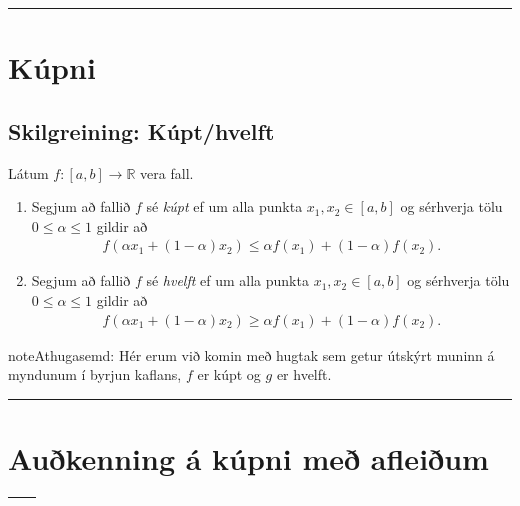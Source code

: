\documentclass[b5paper,11pt,icelandic]{sphinxmanual}
\begin{document}



\bigskip\hrule{}\bigskip



\section{Kúpni}
\label{kafli05:kupni}

\subsection{Skilgreining: Kúpt/hvelft}
\label{kafli05:index-0}\label{kafli05:skilgreining-kupt-hvelft}
Látum \(f:[a, b]\rightarrow {\mathbb  R}\) vera fall.
\begin{enumerate}
\item {} 
Segjum að fallið \(f\) sé \textit{kúpt} ef um
alla punkta \(x_1, x_2\in [a, b]\) og sérhverja tölu
\(0\leq
\alpha\leq 1\) gildir að
\begin{equation*}
\begin{split}f(\alpha x_1+(1-\alpha)x_2)\leq \alpha f(x_1)+(1-\alpha)f(x_2).\end{split}
\end{equation*}
\item {} 
Segjum að fallið \(f\) sé \textit{hvelft}
ef um alla punkta \(x_1, x_2\in [a, b]\) og sérhverja tölu
\(0\leq
\alpha\leq 1\) gildir að
\begin{equation*}
\begin{split}f(\alpha x_1+(1-\alpha)x_2)\geq \alpha f(x_1)+(1-\alpha)f(x_2).\end{split}
\end{equation*}
\end{enumerate}

\begin{notice}{note}{Athugasemd:}
Hér erum við komin með hugtak sem getur útskýrt muninn á myndunum í byrjun
kaflans, \(f\) er kúpt og \(g\) er hvelft.
\end{notice}


\bigskip\hrule{}\bigskip



\section{Auðkenning á kúpni með afleiðum}
\label{kafli05:aukenning-a-kupni-me-afleium}
\noindent\begin{tabulary}{\linewidth}{|L|L|}
\hline
{}\label{kafli05:id1}
&\label{kafli05:id2}
\\
\hline\end{tabulary}
\end{document}
